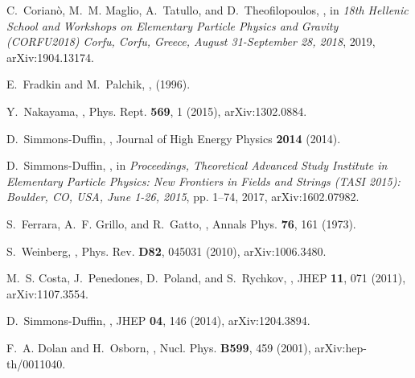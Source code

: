 \documentclass[a4paper,11pt,openright,twoside]{book}
\numberwithin{equation}{section}
\begin{document}
{{\begin{thebibliography}{100}
	C.~Corian\`o, M.~M. Maglio, A.~Tatullo, and D.~Theofilopoulos,
	,
	\newblock in {\em {18th Hellenic School and Workshops on Elementary Particle
			Physics and Gravity (CORFU2018) Corfu, Corfu, Greece, August 31-September 28,
			2018}}, 2019, arXiv:1904.13174.
	
	E.~Fradkin and M.~Palchik,
	,
	\newblock (1996).
	
	Y.~Nakayama,
	,
	\newblock Phys. Rept. {\bf 569}, 1 (2015), arXiv:1302.0884.
	
	D.~Simmons-Duffin,
	,
	\newblock Journal of High Energy Physics {\bf 2014} (2014).
	
	D.~Simmons-Duffin,
	,
	\newblock in {\em {Proceedings, Theoretical Advanced Study Institute in
			Elementary Particle Physics: New Frontiers in Fields and Strings (TASI 2015):
			Boulder, CO, USA, June 1-26, 2015}}, pp. 1--74, 2017, arXiv:1602.07982.
	
	S.~Ferrara, A.~F. Grillo, and R.~Gatto,
	,
	\newblock Annals Phys. {\bf 76}, 161 (1973).
	
	S.~Weinberg,
	,
	\newblock Phys. Rev. {\bf D82}, 045031 (2010), arXiv:1006.3480.
	
	M.~S. Costa, J.~Penedones, D.~Poland, and S.~Rychkov,
	,
	\newblock JHEP {\bf 11}, 071 (2011), arXiv:1107.3554.
	
	D.~Simmons-Duffin,
	,
	\newblock JHEP {\bf 04}, 146 (2014), arXiv:1204.3894.
	
	F.~A. Dolan and H.~Osborn,
	,
	\newblock Nucl. Phys. {\bf B599}, 459 (2001), arXiv:hep-th/0011040.
	

\end{thebibliography}}}
\end{document}
